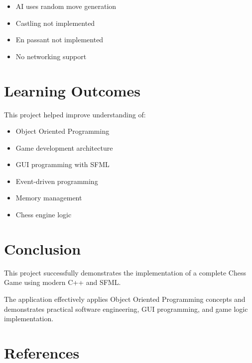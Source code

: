 \documentclass[11pt]{article}
\begin{document}
\begin{itemize}
    \item AI uses random move generation
    \item Castling not implemented
    \item En passant not implemented
    \item No networking support
\end{itemize}


\section{Learning Outcomes}

This project helped improve understanding of:

\begin{itemize}
    \item Object Oriented Programming
    \item Game development architecture
    \item GUI programming with SFML
    \item Event-driven programming
    \item Memory management
    \item Chess engine logic
\end{itemize}


\section{Conclusion}

This project successfully demonstrates the implementation of a complete Chess Game using modern C++ and SFML.

The application effectively applies Object Oriented Programming concepts and demonstrates practical software engineering, GUI programming, and game logic implementation.

\newpage
\section{References}
\end{document}

